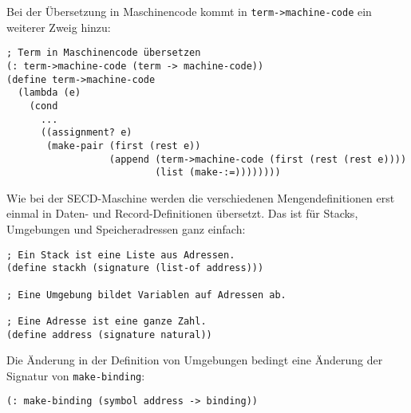 Bei der Übersetzung in Maschinencode kommt in
\texttt{term->machine-code} ein weiterer Zweig hinzu:
%
\begin{verbatim}
; Term in Maschinencode übersetzen
(: term->machine-code (term -> machine-code))
(define term->machine-code
  (lambda (e)
    (cond
      ...
      ((assignment? e)
       (make-pair (first (rest e))
                  (append (term->machine-code (first (rest (rest e))))
                          (list (make-:=))))))))
\end{verbatim}
%
Wie bei der SECD-Maschine werden die verschiedenen Mengendefinitionen
erst einmal in Daten- und Record-Definitionen übersetzt.  Das ist für
Stacks, Umgebungen und Speicheradressen ganz einfach:
%
\begin{verbatim}
; Ein Stack ist eine Liste aus Adressen.
(define stackh (signature (list-of address)))

; Eine Umgebung bildet Variablen auf Adressen ab.

; Eine Adresse ist eine ganze Zahl.
(define address (signature natural))
\end{verbatim}
%
Die Änderung in der Definition von Umgebungen bedingt eine Änderung
der Signatur von \texttt{make-binding}:
%
\begin{verbatim}
(: make-binding (symbol address -> binding))
\end{verbatim}

